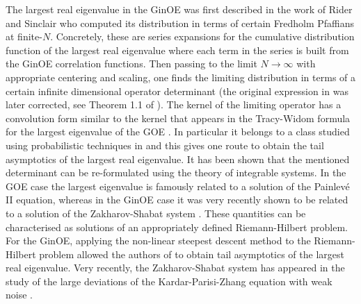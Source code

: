 \documentclass[11pt,reqno]{amsproc}
\numberwithin{equation}{section}
\numberwithin{theorem}{section}
\begin{document}
The largest real eigenvalue in the GinOE was first described in the work of Rider and Sinclair \cite{RS14} who computed its distribution in terms of certain Fredholm Pfaffians at finite-$N$. Concretely, these are series expansions for the cumulative distribution function of the largest real eigenvalue where each term in the series is built from the GinOE correlation functions. Then passing to the limit $N \to \infty$ with appropriate centering and scaling, one finds the limiting distribution in terms of a certain infinite dimensional operator determinant  (the original expression in \cite{RS14} was later corrected, see Theorem 1.1 of \cite{PTZ17}). The kernel of the limiting operator has a convolution form similar to the kernel that appears in the Tracy-Widom formula for the largest eigenvalue of the GOE \cite{TW94,TW96}.
In particular it belongs to a class studied using probabilistic techniques in \cite{FTZ20, FTZ21} and this gives one route to obtain the tail asymptotics of the largest real eigenvalue. It has been shown that the mentioned determinant can be re-formulated using the theory of integrable systems. In the GOE case the largest eigenvalue is famously related to a solution of the Painlev\'e II equation, whereas in the GinOE case it was very recently shown to be related to a solution of the Zakharov-Shabat system \cite{BB20}. These quantities can be characterised as solutions of an appropriately defined Riemann-Hilbert problem. For the GinOE, applying the non-linear steepest descent method to the Riemann-Hilbert problem allowed the authors of \cite{BB20} to obtain tail asymptotics of the largest real eigenvalue. Very recently, the Zakharov-Shabat system has appeared in the study of the large deviations of the Kardar-Parisi-Zhang equation with weak noise \cite{LDK}. 
\end{document}
